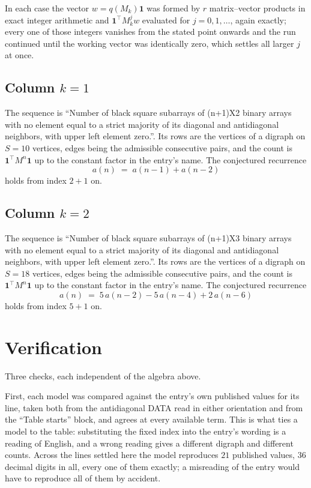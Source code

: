\documentclass[11pt,a4paper]{article}
\theoremstyle{plain}
\theoremstyle{definition}
\begin{document}
In each case the vector $w=q(M_k)\mathbf{1}$ was formed by $r$ matrix--vector products in
exact integer arithmetic and $\mathbf{1}^{\!\top}M_k^{j}w$ evaluated for $j=0,1,\dots$,
again exactly; every one of those integers vanishes from the stated point onwards and the run
continued until the working vector was identically zero, which settles all larger $j$ at once.

\subsection*{Column $k$$=1$}
The sequence is ``Number of black square subarrays of (n+1)X2 binary arrays with no element equal to a strict majority of its diagonal and antidiagonal neighbors, with upper left element zero.''. Its rows are the vertices of a digraph on
$S=10$ vertices, edges being the admissible consecutive pairs, and the count is
$\mathbf{1}^{\!\top}M^{n}\mathbf{1}$ up to the constant factor in the entry's name.
The conjectured recurrence
\[
a(n)\;=\;a(n-1) + a(n-2)
\]
holds from index $2+1$ on.

\subsection*{Column $k$$=2$}
The sequence is ``Number of black square subarrays of (n+1)X3 binary arrays with no element equal to a strict majority of its diagonal and antidiagonal neighbors, with upper left element zero.''. Its rows are the vertices of a digraph on
$S=18$ vertices, edges being the admissible consecutive pairs, and the count is
$\mathbf{1}^{\!\top}M^{n}\mathbf{1}$ up to the constant factor in the entry's name.
The conjectured recurrence
\[
a(n)\;=\;5\,a(n-2) - 5\,a(n-4) + 2\,a(n-6)
\]
holds from index $5+1$ on.

\section{Verification}

Three checks, each independent of the algebra above.

First, each model was compared against the entry's own published values for its line, taken
both from the antidiagonal DATA read in either orientation and from the ``Table starts''
block, and agrees at every available term. This is what ties a model to the table:
substituting the fixed index into the entry's wording is a reading of English, and a wrong
reading gives a different digraph and different counts. Across the lines settled here the
model reproduces $21$ published values, $36$ decimal digits in all, every one of
them exactly; a misreading of the entry would have to reproduce all of them by accident.
\end{document}
